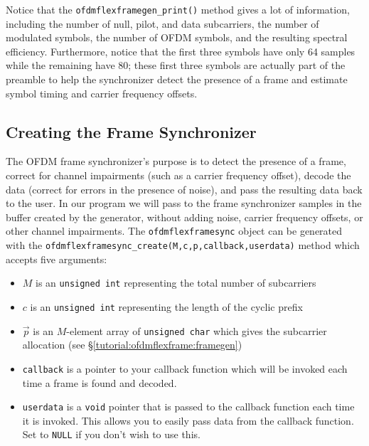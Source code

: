 %
Notice that the {\tt ofdmflexframegen\_print()} method gives a lot of
information, including
the number of null, pilot, and data subcarriers,
the number of modulated symbols,
the number of OFDM symbols,
and the resulting spectral efficiency.
Furthermore, notice that the first three symbols have only 64 samples
while the remaining have 80;
these first three symbols are actually part of the preamble to help the
synchronizer detect the presence of a frame and estimate symbol timing
and carrier frequency offsets.

%
%
\subsection{Creating the Frame Synchronizer}
\label{tutorial:ofdmflexframe:framesync}
The OFDM frame synchronizer's purpose is to detect the presence of a
frame, correct for channel impairments (such as a carrier frequency
offset), decode the data (correct for errors in the presence of noise),
and pass the resulting data back to the user.
In our program we will pass to the frame synchronizer samples in the
buffer created by the generator, without adding noise, carrier frequency
offsets, or other channel impairments.
%
The {\tt ofdmflexframesync} object can be generated with the
{\tt ofdmflexframesync\_create(M,c,p,callback,userdata)} method which
accepts five arguments:
%
\begin{itemize}
\item $M$ is an {\tt unsigned int} representing the total number of
    subcarriers
\item $c$ is an {\tt unsigned int} representing the length of the
    cyclic prefix
\item $\vec{p}$ is an $M$-element array of {\tt unsigned char} which
    gives the subcarrier allocation
    (see \S\ref{tutorial:ofdmflexframe:framegen})
\item {\tt callback}
    is a pointer to your callback function which will be invoked each
    time a frame is found and decoded.
\item {\tt userdata}
    is a {\tt void} pointer that is passed to the callback function each
    time it is invoked.
    This allows you to easily pass data from the callback function.
    Set to {\tt NULL} if you don't wish to use this.
\end{itemize}
